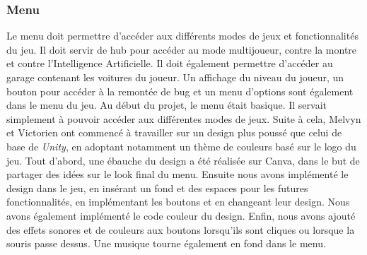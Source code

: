 \documentclass[a4paper,12pt]{article}
\newcommand{\AI}{Intelligence Artificielle}
\begin{document}
            \subsubsection{Menu}
                Le menu doit permettre d'accéder aux différents modes de jeux et fonctionnalités du jeu.
                Il doit servir de hub pour accéder au mode multijoueur, contre la montre et contre l'\AI.
                Il doit également permettre d'accéder au garage contenant les voitures du joueur. Un affichage
                du niveau du joueur, un bouton pour accéder à la remontée de bug et un menu d'options 
                sont également dans le menu du jeu. Au début du projet, le menu était basique. Il servait 
                simplement à pouvoir accéder aux différentes modes de jeux. Suite à cela, Melvyn et Victorien 
                ont commencé à travailler sur un design plus poussé que celui de base de \textsl{Unity}, 
                en adoptant notamment un thème de couleurs basé sur le logo du jeu. Tout d'abord, une
                ébauche du design a été réalisée sur Canva, dans le but de partager des idées sur le look
                final du menu. Ensuite nous avons implémenté le design dans le jeu, en insérant un fond
                et des espaces pour les futures fonctionnalités, en implémentant les boutons et en changeant
                leur design. Nous avons également implémenté le code couleur du design. Enfin, nous avons 
                ajouté des effets sonores et de couleurs aux boutons lorsqu'ils sont cliques ou lorsque
                la souris passe dessus. Une musique tourne également en fond dans le menu.
\end{document}
